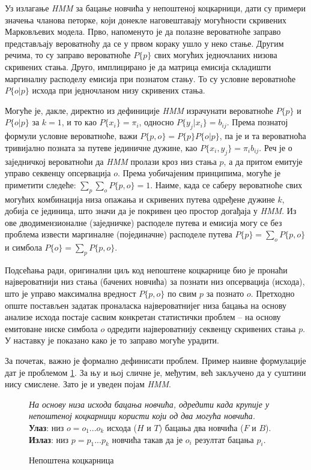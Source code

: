 \documentclass[12pt,oneside]{memoir}
\newenvironment{problem}[1][!ht]
{\renewcommand{\algorithmcfname}{Проблем}
\begin{figure}[!ht]
\centering
  \begin{minipage}{.94\linewidth}
	\begin{algorithm}[#1]%
  }{\end{algorithm}
  \end{minipage}
\end{figure}}
\begin{document}
\begin{CJK}{UTF8}{ipxm}
Уз излагање \textit{HMM} за бацање новчића у непоштеној коцкарници, дати су примери значења чланова петорке, који донекле наговештавају могућности скривених Марковљевих модела. Прво, напоменуто је да полазне вероватноће заправо представљају вероватноћу да се у првом кораку ушло у неко стање. Другим речима, то су заправо вероватноће $P\{p\}$ свих могућих једночланих низова скривених стања. Друго, имплицирано је да матрица емисија складишти маргиналну расподелу емисија при познатом стању. То су условне вероватноће $P\{o | p\}$ исхода при једночланом низу скривених стања.

Могуће је, дакле, директно из дефиниције \textit{HMM} израчунати вероватноће  $P\{p\}$ и $P\{o | p\}$ за $k = 1$, и то као $P\{x_i\} = \pi_i$, односно $P\{y_j | x_i\} = b_{ij}$. Према познатој формули условне вероватноће, важи $P\{p, o\} = P\{p\} P\{o | p\}$, па је и та вероватноћа тривијално позната за путеве јединичне дужине, као $P\{x_i, y_j\} = \pi_i b_{ij}$. Реч је о заједничкој вероватноћи да \textit{HMM} пролази кроз низ стања $p$, а да притом емитује управо секвенцу опсервација $o$. Према уобичајеним принципима, могуће је приметити следеће: $\sum_p \sum_o P\{p, o\} = 1$. Наиме, када се саберу вероватноће свих могућих комбинација низа опажања и скривених путева одређене дужине $k$, добија се јединица, што значи да је покривен цео простор догађаја у \textit{HMM}. Из ове дводимензионалне (заједничке) расподеле путева и емисија могу се без проблема извести маргиналне (појединачне) расподеле путева $P\{p\} = \sum_o P\{p, o\}$ и симбола $P\{o\} = \sum_p P\{p, o\}$.

Подсећања ради, оригинални циљ код непоштене коцкарнице био је пронаћи највероватнији низ стања (бачених новчића) за познати низ опсервација (исхода), што је управо максимална вредност $P\{p, o\}$ по свим $p$ за познато $o$. Претходно опште постављен задатак проналаска највероватнијег низа бацања на основу анализе исхода постаје сасвим конкретан статистички проблем -- на основу емитоване ниске симбола $o$ одредити највероватнију секвенцу скривених стања $p$. У наставку је показано како је то заправо могуће урадити.

За почетак, важно је формално дефинисати проблем. Пример наивне формулације дат је проблемом \ref{prob:kock}. За њу и њој сличне је, међутим, већ закључено да у суштини нису смислене. Зато је и уведен појам \textit{HMM}.

\begin{problem}[H]
  \SetAlgoLined
  \textit{На основу низа исхода бацања новчића, одредити када крупије у непоштеној коцкарници користи који од два могућа новчића.}\\
  \textbf{Улаз}: низ $o = o_1...o_k$ исхода ($H$ и $T$) бацања два новчића ($F$ и $B$).\\
  \textbf{Излаз}: низ $p = p_1...p_k$ новчића такав да је $o_i$ резултат бацања $p_i$.
  \caption{Непоштена коцкарница}
  \label{prob:kock}
\end{problem}


\end{CJK}
\end{document}
